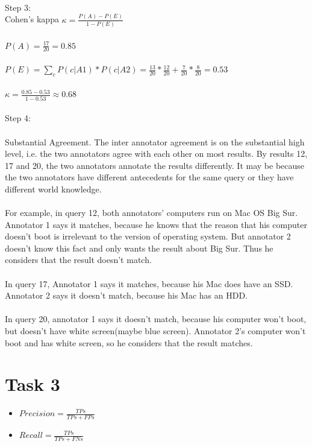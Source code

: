 \documentclass[a4paper]{scrartcl}
\begin{document}
\\
\\
\\
Step 3:\\
Cohen's kappa $\kappa = \frac{P(A) - P(E)}{1 - P(E)}$\\
\\
$P(A) = \frac{17}{20} = 0.85$\\
\\
$P(E) = \sum_{c} P(c | A1) * P(c | A2) = \frac{13}{20}*\frac{12}{20} + \frac{7}{20}*\frac{8}{20} = 0.53$\\
\\
$\kappa = \frac{0.85 - 0.53}{1 - 0.53} \approx 0.68$\\
\\
\clearpage
\noindent Step 4:\\
\\
Substantial Agreement. The inter annotator agreement is on the substantial high level, i.e. the two annotators agree with each other on most results. By results 12, 17 and 20, the two annotators annotate the results differently. It may be because the two annotators have different antecedents for the same query or they have different world knowledge.\\
\\
For example, in query 12, both annotators' computers run on Mac OS Big Sur. Annotator 1 says it matches, because he knows that the reason that his computer doesn't boot is irrelevant to the version of operating system. But annotator 2 doesn't know this fact and only wants the result about Big Sur. Thus he considers that the result doesn't match.\\
\\
In query 17, Annotator 1 says it matches, because his Mac does have an SSD. Annotator 2 says it doesn't match, because his Mac has an HDD.\\
\\
In query 20, annotator 1 says it doesn't match, because his computer won't boot, but doesn't have white screen(maybe blue screen). Annotator 2's computer won't boot and has white screen, so he considers that the result matches.\\

\pagebreak
\section*{Task 3}

\begin{itemize}
    \item $Precision = \frac{TPs}{TPs+FPs}$
    \item $Recall = \frac{TPs}{TPs+FNs}$
\end{itemize}
\end{document}
